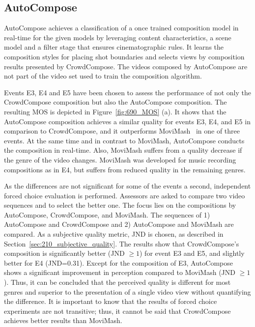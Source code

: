 \subsection{AutoCompose}
\label{sec:690_evalAutoCompose}
AutoCompose achieves a classification of a once trained composition model in real-time for the given models by leveraging content characteristics, a scene model and a filter stage that ensures cinematographic rules.
It learns the composition styles for placing shot boundaries and selects views by composition results presented by CrowdCompose.
The videos composed by AutoCompose are not part of the video set used to train the composition algorithm.

Events E3, E4 and E5 have been chosen to assess the performance of not only the CrowdCompose composition but also the AutoCompose composition. 
The resulting \ac{MOS} is depicted in Figure~\ref{fig:690_MOS} (a).
It shows that the AutoCompose composition achieves a similar quality for events E3, E4, and E5 in comparison to CrowdCompose, and it outperforms MoviMash~\cite{Saini2012} in one of three events.
At the same time and in contrast to MoviMash, AutoCompose conducts the composition in real-time.
Also, MoviMash suffers from a quality decrease if the genre of the video changes. 
MoviMash was developed for music recording compositions as in E4, but suffers from reduced quality in the remaining genres.

As the differences are not significant for some of the events a second, independent forced choice evaluation is performed.
Assessors are asked to compare two video sequences and to select the better one.
The focus lies on the compositions by AutoCompose, CrowdCompose, and MoviMash.
The sequences of 1) AutoCompose and CrowdCompose and 2) AutoCompose and MoviMash are compared.
As a subjective quality metric, \ac{JND} is chosen, as described in Section~\ref{sec:210_subjective_quality}.
The results show that CrowdCompose's composition is significantly better (JND $\geq 1$) for event E3 and E5, and slightly better for E4 (JND=0.31). 
Except for the composition of E3, AutoCompose shows a significant improvement in perception compared to MoviMash (JND $\geq 1$).
Thus, it can be concluded that the perceived quality is different for most genres and superior to the presentation of a single video view without quantifying the difference.
It is important to know that the results of forced choice experiments are not transitive; thus, it cannot be said that CrowdCompose achieves better results than MoviMash.


